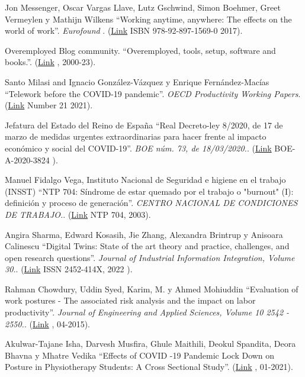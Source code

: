 \documentclass[spanish,final]{setup/eetac_tfc_pfc}
\begin{document}
\begin{thebibliography}{2}
Jon Messenger, Oscar Vargas Llave, Lutz Gschwind, Simon Boehmer, Greet Vermeylen y Mathijn Wilkens
``Working anytime, anywhere: The effects on the world of work''. {\it Eurofound }.
(\href{https://www.eurofound.europa.eu/sites/default/files/ef_publication/field_ef_document/ef1658en.pdf}{Link} ISBN 978-92-897-1569-0  2017).

Overemployed Blog community.
``Overemployed, tools, setup, software and books.''.
(\href{https://overemployed.com/}{Link} , 2000-23).


Santo Milasi and Ignacio González-Vázquez y Enrique Fernández-Macías
``Telework before the COVID-19 pandemic''. {\it OECD Productivity Working Papers}.
(\href{https://www.oecd-ilibrary.org/content/paper/d5e42dd1-en}{Link}  Number 21 2021).

 Jefatura del Estado del Reino de España
``Real Decreto-ley 8/2020, de 17 de marzo de medidas urgentes extraordinarias para hacer frente al impacto económico y social del COVID-19''. {\it BOE núm. 73, de 18/03/2020.}.
(\href{https://www.boe.es/eli/es/rdl/2020/03/17/8/con}{Link} 
BOE-A-2020-3824 ).

 Manuel Fidalgo Vega, Instituto Nacional de Seguridad e higiene en el trabajo (INSST)
``NTP 704: Síndrome de estar quemado por el trabajo o
"burnout" (I): definición y proceso de generación''. {\it CENTRO NACIONAL DE CONDICIONES DE TRABAJO.}.
(\href{https://www.insst.es/documents/94886/326775/ntp_704.pdf}{Link} 
NTP 704, 2003).

 Angira Sharma, Edward Kosasih, Jie Zhang, Alexandra Brintrup y Anisoara Calinescu
``Digital Twins: State of the art theory and practice, challenges, and open research questions''. {\it Journal of Industrial Information Integration, Volume 30.}.
(\href{https://www.sciencedirect.com/science/article/pii/S2452414X22000516}{Link} 
ISSN 2452-414X, 2022 ).

Rahman Chowdury, Uddin Syed, Karim, M. y Ahmed Mohiuddin
``Evaluation of work postures - The associated risk analysis and the impact on labor productivity''. {\it Journal of Engineering and Applied Sciences, Volume 10 2542 - 2550.}.
(\href{https://www.researchgate.net/publication/275892689_Evaluation_of_work_postures_-_The_associated_risk_analysis_and_the_impact_on_labor_productivity}{Link} , 04-2015).

Akulwar-Tajane Isha, Darvesh Musfira, Ghule Maithili, Deokul Spandita, Deora Bhavna y Mhatre Vedika
``Effects of COVID -19 Pandemic Lock Down on Posture in Physiotherapy Students: A Cross Sectional Study''.
(\href{https://www.researchgate.net/publication/349179203_Effects_of_COVID_-19_Pandemic_Lock_Down_on_Posture_in_Physiotherapy_Students_A_Cross_Sectional_Study}{Link} , 01-2021).


\end{thebibliography}
\end{document}
